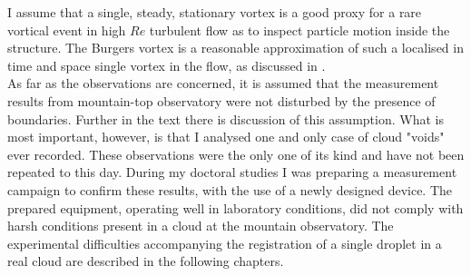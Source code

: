 \documentclass[../main.tex]{subfiles}
\begin{document}
I assume that a single, steady, stationary vortex is a good proxy for a rare vortical event in high $Re$ turbulent flow as to inspect particle motion inside the structure. The Burgers vortex is a reasonable approximation of such a localised in time and space single vortex in the flow, as discussed in \citet{Wilczek2011}. \\
As far as the observations are concerned, it is assumed that the measurement results from mountain-top observatory were not disturbed by the presence of boundaries. Further in the text there is discussion of this assumption. What is most important, however, is that I analysed one and only case of cloud "voids" ever recorded. These observations were the only one of its kind and have not been repeated to this day. During my doctoral studies I was preparing a measurement campaign to confirm these results, with the use of a newly designed device. The prepared equipment, operating well in laboratory conditions, did not comply with harsh conditions present in a cloud at the mountain observatory. The experimental difficulties accompanying the registration of a single droplet in a real cloud are described in the following chapters.\\



\end{document}
